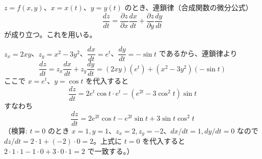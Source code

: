 
$z = f(x,y)$、$x = x(t)$、$y = y(t)$ のとき、連鎖律（合成関数の微分公式）
\[
\frac{dz}{dt} = \frac{\partial z}{\partial x}\frac{dx}{dt} + \frac{\partial z}{\partial y}\frac{dy}{dt}
\]
が成り立つ。これを用いる。

$z_{x} = 2xy$、$z_{y} = x^{2} - 3y^{2}$、$\dfrac{dx}{dt} = e^{t}$、$\dfrac{dy}{dt} = -\sin t$ であるから、連鎖律より
\[
\frac{dz}{dt} = z_{x}\frac{dx}{dt} + z_{y}\frac{dy}{dt}
= (2xy)(e^{t}) + (x^{2}-3y^{2})(-\sin t)
\]
ここで $x = e^{t}$、$y=\cos t$ を代入すると
\[
\frac{dz}{dt} = 2e^{t}\cos t \cdot e^{t} - (e^{2t} - 3\cos^{2}t)\sin t
\]
すなわち
\[
\boxed{\; \frac{dz}{dt} = 2e^{2t}\cos t - e^{2t}\sin t + 3\sin t\cos^{2}t \;}
\]
（検算: $t=0$ のとき $x=1,y=1$、$z_x=2,z_y=-2$、$dx/dt=1,dy/dt=0$ なので $dz/dt=2\cdot1+(-2)\cdot0=2$。上式に $t=0$ を代入すると $2\cdot1\cdot1 - 1\cdot0 + 3\cdot0\cdot1 = 2$ で一致する。）
